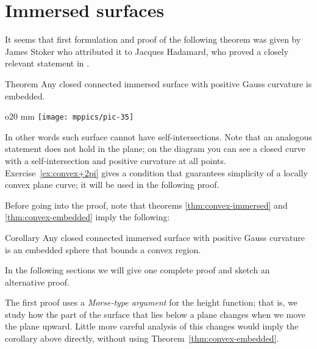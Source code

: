  


























\section*{Immersed surfaces}

It seems that first formulation and proof of the following theorem was given by James Stoker \cite{stoker} who attributed it to Jacques Hadamard, who proved a closely relevant statement in \cite[item 23]{hadamard}.


\begin{thm}{Theorem}\label{thm:convex-immersed}
Any closed connected immersed surface with positive Gauss curvature is embedded.
\end{thm}

\begin{wrapfigure}{o}{20 mm}
\vskip-0mm
\centering
\texttt{[image: mppics/pic-35]}
\vskip-0mm
\end{wrapfigure}

In other words such surface cannot have self-intersections.
Note that an analogous statement does not hold in the plane;
on the diagram you can see a closed curve with a self-intersection and positive curvature at all points.
Exercise~\ref{ex:convex+2pi} gives a condition that guarantees simplicity of a locally convex plane curve;
it will be used in the following proof.



Before going into the proof, note that theorems \ref{thm:convex-immersed} and \ref{thm:convex-embedded}
imply the following:

\begin{thm}{Corollary}
Any closed connected immersed surface with positive Gauss curvature is an embedded sphere that bounds a convex region.
\end{thm}

In the following sections we will give one complete proof and sketch an alternative proof.

The first proof uses a \emph{Morse-type argument} for the height function;
that is, we study how the part of the surface that lies below a plane changes when we move the plane upward.
Little more careful analysis of this changes would imply the corollary above directly, without using Theorem~\ref{thm:convex-embedded}.

